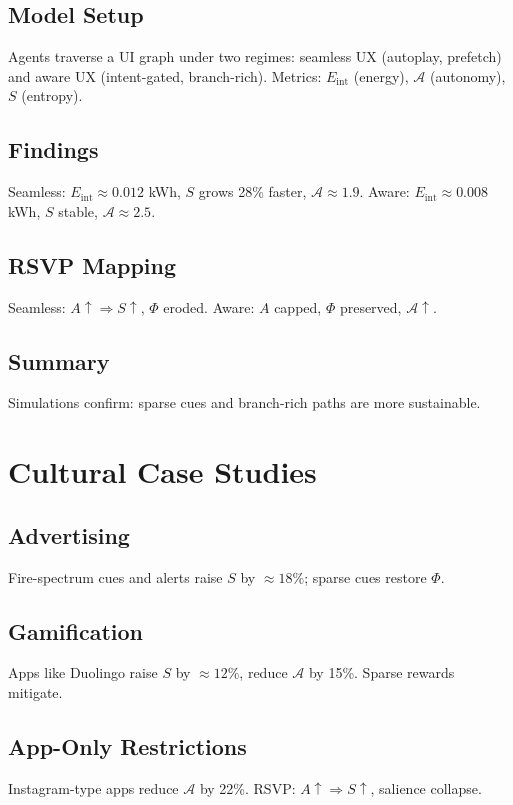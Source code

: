 \documentclass[openany]{book}
\newcommand{\Eint}{E_{\mathrm{int}}} %
\newcommand{\Auton}{\mathcal{A}} %
\begin{document}
\section{Model Setup}
Agents traverse a UI graph under two regimes: seamless UX (autoplay, prefetch) and aware UX (intent-gated, branch-rich).  
Metrics: $\Eint$ (energy), $\Auton$ (autonomy), $S$ (entropy).

\section{Findings}
Seamless: $\Eint\approx 0.012$ kWh, $S$ grows 28\% faster, $\Auton\approx 1.9$.  
Aware: $\Eint\approx 0.008$ kWh, $S$ stable, $\Auton\approx 2.5$.

\section{RSVP Mapping}
Seamless: $A\uparrow \Rightarrow S\uparrow$, $\Phi$ eroded.  
Aware: $A$ capped, $\Phi$ preserved, $\Auton\uparrow$.

\section{Summary}
Simulations confirm: sparse cues and branch-rich paths are more sustainable.

\chapter{Cultural Case Studies}
\label{app:cultural}

\section{Advertising}
Fire-spectrum cues and alerts raise $S$ by $\approx 18\%$; sparse cues restore $\Phi$.

\section{Gamification}
Apps like Duolingo raise $S$ by $\approx 12\%$, reduce $\Auton$ by 15\%. Sparse rewards mitigate.

\section{App-Only Restrictions}
Instagram-type apps reduce $\Auton$ by 22\%. RSVP: $A\uparrow \Rightarrow S\uparrow$, salience collapse.
\end{document}
